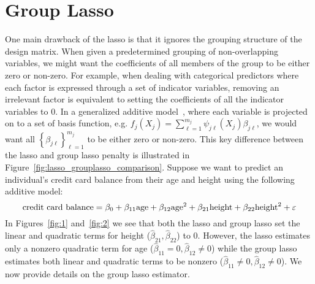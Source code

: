 \section{Group Lasso}

One main drawback of the lasso is that it ignores the grouping structure of the design matrix. When given a predetermined grouping of non-overlapping variables, we might want the coefficients of all members of the group to be either zero or non-zero. 
For example, when dealing with categorical predictors where each factor is expressed through a set of indicator variables, removing an irrelevant factor is equivalent to setting the coefficients of all the indicator variables to 0. In a generalized additive model~\citep{hastie1987generalized}, where each variable is projected on to a set of basis function, e.g. $f_j(X_j) = \sum_{\ell = 1}^{m_j} \psi_{j\ell}(X_j) \beta_{j\ell}$, we would want all $\left\lbrace \beta_{j\ell}\right\rbrace_{\ell=1}^{m_j}$ to be either zero or non-zero. This key difference between the lasso and group lasso penalty is illustrated in Figure~\ref{fig:lasso_grouplasso_comparison}. 
Suppose we want to predict an individual's credit card balance from their age and height using the following additive model:
\begin{equation}
\textrm{{credit card balance}} = \beta_0 + \beta_{11}\textrm{{age}} + \beta_{12}\textrm{{age}}^2 + \beta_{21}\textrm{{height}} + \beta_{22}\textrm{{height}}^2 + \varepsilon \label{eq:credit_card}
\end{equation}  
In Figures~\ref{fig:1} and~\ref{fig:2} we see that both the lasso and group lasso set the linear and quadratic terms for height ($\hat\beta_{21},\hat\beta_{22}$) to 0. However, the lasso estimates only a nonzero quadratic term for age ($\hat\beta_{11}=0, \hat\beta_{12}\neq 0$) while the group lasso estimates both linear and quadratic terms to be nonzero ($\hat\beta_{11}\neq 0, \hat\beta_{12}\neq 0$). We now provide details on the group lasso estimator.



